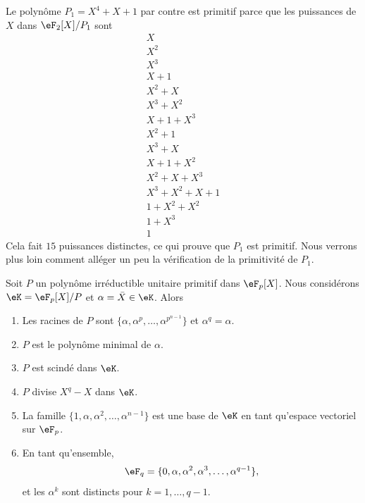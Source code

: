 \begin{example}
    Le polynôme \( P_1=X^4+X+1\) par contre est primitif parce que les puissances de \( X\) dans \( \eF_2[X]/P_1\) sont
    \begin{subequations}
        \begin{align}
            X\\
            X^2\\
            X^3\\
            X+1\\
            X^2+X\\
            X^3+X^2\\
            X+1+X^3\\
            X^2+1\\
            X^3+X\\
            X+1+X^2\\
            X^2+X+X^3\\
            X^3+X^2+X+1\\
            1+X^2+X^2\\
            1+X^3\\
            1
        \end{align}
    \end{subequations}
    Cela fait \( 15\) puissances distinctes, ce qui prouve que \( P_1\) est primitif. Nous verrons plus loin comment alléger un peu la vérification de la primitivité de \( P_1\).
\end{example}

\begin{proposition}     \label{PropNsLqWb}
    Soit \( P\) un polynôme irréductible unitaire primitif dans \( \eF_p[X]\). Nous considérons \( \eK=\eF_p[X]/P\) et \( \alpha=\bar X\in \eK\). Alors
    \begin{enumerate}
        \item
            Les racines de \( P\) sont \( \{ \alpha,\alpha^p,\ldots, \alpha^{p^{n-1}} \}\) et \( \alpha^q=\alpha\).
        \item
            \( P\) est le polynôme minimal de \( \alpha\).
        \item
            \( P\) est scindé dans \( \eK\).
        \item
            \( P\) divise \( X^q-X\) dans \( \eK\).
        \item
            La famille \( \{1, \alpha,\alpha^2,\ldots, \alpha^{n-1} \}\) est une base de \( \eK\) en tant qu'espace vectoriel sur \( \eF_p\).
        \item
            En tant qu'ensemble,
            \begin{equation}
                \eF_q=\{0, \alpha,\alpha^2,\alpha^3,\ldots, \alpha^{q-1} \},
            \end{equation}
            et les \( \alpha^k\) sont distincts pour \( k=1,\ldots, q-1\).
    \end{enumerate}
\end{proposition}


